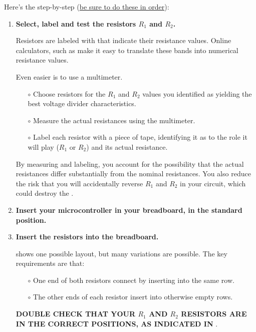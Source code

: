 Here's the step-by-step (\underline{be sure to do these in order}):
\begin{enumerate}
	\item \textbf{Select, label and test the resistors $R_1$ and $R_2$.}

	Resistors are labeled with  that indicate their resistance values.
	Online calculators, such as  make it easy to translate these bands into numerical resistance values.

	\smallskip
	Even easier is to use a multimeter.
	\begin{itemize}
		\item[$\circ$] Choose resistors for the $R_1$ and $R_2$ values you identified as yielding the best voltage divider characteristics.
		\item[$\circ$] Measure the actual resistances using the multimeter.
		\item[$\circ$] Label each resistor with a piece of tape, identifying it as to the role it will play ($R_1$ or $R_2$) and its actual resistance.
	\end{itemize}
	By measuring and labeling, you account for the possibility that the actual resistances differ substantially from the nominal resistances.
	You also reduce the risk that you will accidentally reverse $R_1$ and $R_2$ in your circuit, which could destroy the \adc.

	\item \textbf{Insert your microcontroller in your breadboard, in the standard position.}

	\item \textbf{Insert the resistors into the breadboard.}

	 shows one possible layout, but many variations are possible.
	The key requirements are that:
	\begin{itemize}
		\item[$\circ$] One end of both resistors connect by inserting into the same row.
		\item[$\circ$] The other ends of each resistor insert into otherwise empty rows.
	\end{itemize}
	\textbf{DOUBLE CHECK THAT YOUR $R_1$ AND $R_2$ RESISTORS ARE IN THE CORRECT POSITIONS, AS INDICATED IN }.


\end{enumerate}
